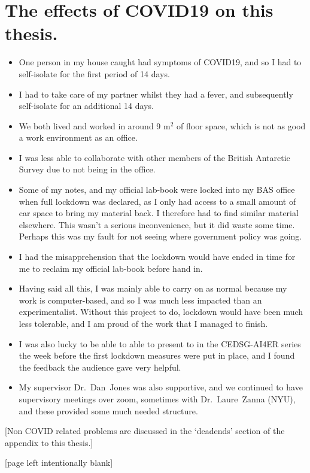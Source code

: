 
\section*{The effects of COVID19 on this thesis.}
\begin{itemize}

\item One person in my house caught had symptoms of COVID19, and so I had to self-isolate
      for the first period of 14 days.

\item I had to take care of my partner whilst
      they had a fever, and subsequently self-isolate for an additional 14 days.

\item We both lived and worked in around 9 m$^{2}$ of floor space, which is not as
      good a work environment as an office.

\item I was less able to collaborate with other members
      of the British Antarctic Survey due to not being in the office.

\item Some of my notes, and my official lab-book were locked into my BAS office when full lockdown was declared,
      as I only had access to a small amount of car space to bring my material back.
      I therefore had to find similar material elsewhere. This wasn't a serious inconvenience,
      but it did waste some time. Perhaps this was my fault for not seeing where government policy was going.

\item I had the misapprehension that the lockdown would have ended in time for me to
      reclaim my official lab-book before hand in.

\item Having said all this, I was mainly able to carry on as normal because
      my work is computer-based, and so I was much less impacted than an experimentalist.
      Without this project to do, lockdown would have been much less tolerable,
      and I am proud of the work that I managed to finish.

\item I was also lucky to be able to able to present to in the CEDSG-AI4ER series
      the week before the first lockdown measures were put in place, and
      I found the feedback the audience gave very helpful.

\item My supervisor Dr.~Dan~Jones was also supportive,
      and we continued to have supervisory meetings over zoom,
      sometimes with Dr.~Laure~Zanna (NYU), and these provided some much
      needed structure.

\end{itemize}

[Non COVID related problems are discussed in the `deadends' section of the
appendix to this thesis.]


\newpage

[page left intentionally blank]
\newpage
